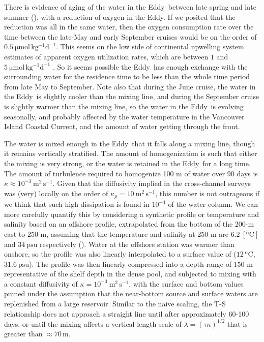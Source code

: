 \documentclass[draft]{agujournal2019}
\newcommand*{\Eddy}{{\sc Eddy}}
\begin{document}
There is evidence of aging of the water in the \Eddy\ between late spring and late summer (), with a reduction of oxygen in the \Eddy.  If we posited that the reduction was all in the same water, then the oxygen consumption rate over the time between the late-May and early September cruises would be on the order of $0.5\ \mathrm{\mu mol\, kg^{-1} d^{-1}}$.  This seems on the low side of continental upwelling system estimates of apparent oxygen utilization rates, which are between $1$ and $5\  \mathrm{\mu mol\, kg^{-1} d^{-1}}$ \cite{dortchetal94}.   So it seems possible the \Eddy\ has enough exchange with the surrounding water for the residence time to be less than the whole time period from late May to September.  Note also that during the June cruise, the water in the \Eddy\ is slightly cooler than the mixing line, and during the September cruise is slightly warmer than the mixing line, so the water in the \Eddy\ is evolving seasonally, and probably affected by the water temperature in the Vancouver Island Coastal Current, and the amount of water getting through the front.

The water is  mixed enough in the \Eddy\ that it falls along a mixing line, though it remains vertically stratified. The amount of homogenization is such that either the mixing is very strong, or the water is retained in the \Eddy\ for a long time.  The amount of turbulence required to homogenize 100 m of water over 90 days is $\kappa \approx 10^{-3}\ \mathrm{m^2\,s^{-1}}$.  Given that the diffusivity implied in the cross-channel surveys was (very) locally on the order of $\kappa_{\rho} = 10 \ \mathrm{m^2\,s^{-1}}$, this number is not outrageous if we think that such high dissipation is found in $10^{-4}$ of the water column. We can more carefully quantify this by considering a synthetic profile or temperature and salinity based on an offshore profile, extrapolated from the bottom of the 200-m cast to 250 m, assuming that the temperature and salinity at 250 m are $6.2\ \mathrm{[^oC]}$ and $34\ \mathrm{psu}$ respectively ().  Water at the offshore station was warmer than onshore, so the profile was also linearly interpolated to a surface value of ($12\ \mathrm{^oC}$, $31.6\ \mathrm{psu}$).  The profile was then linearly compressed into a depth range of 150 m representative of the shelf depth in the dense pool, and subjected to mixing with a constant diffusivity of $\kappa = 10^{-3}\ \mathrm{m^2\,s^{-1}}$, with the surface and bottom values pinned under the assumption that the near-bottom source and surface waters are replenished from a large reservoir.  Similar to the naive scaling, the T-S relationship does not approach a straight line until after approximately 60-100 days, or until the mixing affects a vertical length scale of $\lambda = \left(\tau \kappa\right)^{1/2}$ that is greater than $\approx 70\,\mathrm{m}$.
\end{document}
